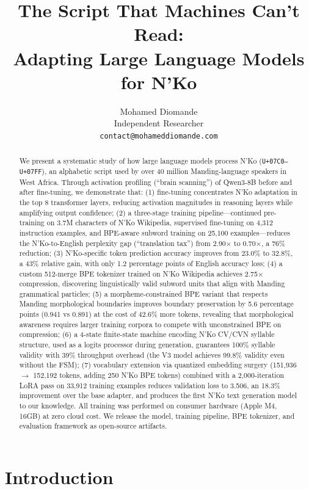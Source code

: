 \documentclass[11pt]{article}
\title{The Script That Machines Can't Read:\\Adapting Large Language Models for N'Ko}
\author{
  Mohamed Diomande \\
  Independent Researcher \\
  \texttt{contact@mohameddiomande.com}
}
\begin{document}
\maketitle

\begin{abstract}
We present a systematic study of how large language models process N'Ko (\texttt{U+07C0--U+07FF}), an alphabetic script used by over 40 million Manding-language speakers in West Africa.
Through activation profiling (``brain scanning'') of Qwen3-8B before and after fine-tuning, we demonstrate that:
(1) fine-tuning concentrates N'Ko adaptation in the top 8 transformer layers, reducing activation magnitudes in reasoning layers while amplifying output confidence;
(2) a three-stage training pipeline---continued pre-training on 3.7M characters of N'Ko Wikipedia, supervised fine-tuning on 4,312 instruction examples, and BPE-aware subword training on 25,100 examples---reduces the N'Ko-to-English perplexity gap (``translation tax'') from 2.90$\times$ to 0.70$\times$, a 76\% reduction;
(3) N'Ko-specific token prediction accuracy improves from 23.0\% to 32.8\%, a 43\% relative gain, with only 1.2 percentage points of English accuracy loss;
(4) a custom 512-merge BPE tokenizer trained on N'Ko Wikipedia achieves 2.75$\times$ compression, discovering linguistically valid subword units that align with Manding grammatical particles;
(5) a morpheme-constrained BPE variant that respects Manding morphological boundaries improves boundary preservation by 5.6 percentage points (0.941 vs 0.891) at the cost of 42.6\% more tokens, revealing that morphological awareness requires larger training corpora to compete with unconstrained BPE on compression;
(6) a 4-state finite-state machine encoding N'Ko CV/CVN syllable structure, used as a logits processor during generation, guarantees 100\% syllable validity with 39\% throughput overhead (the V3 model achieves 99.8\% validity even without the FSM);
(7) vocabulary extension via quantized embedding surgery (151,936 $\to$ 152,192 tokens, adding 250 N'Ko BPE tokens) combined with a 2,000-iteration LoRA pass on 33,912 training examples reduces validation loss to 3.506, an 18.3\% improvement over the base adapter, and produces the first N'Ko text generation model to our knowledge.
All training was performed on consumer hardware (Apple M4, 16GB) at zero cloud cost.
We release the model, training pipeline, BPE tokenizer, and evaluation framework as open-source artifacts.
\end{abstract}

\section{Introduction}
\end{document}
